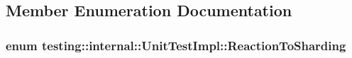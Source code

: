 \subsection{Member Enumeration Documentation}
\hypertarget{classtesting_1_1internal_1_1_unit_test_impl_acc5ffd3f9bc2e87bb3dba4218f58af43}{
\subsubsection[{Reaction\-To\-Sharding}]{\setlength{\rightskip}{0pt plus 5cm}enum {\bf testing\-::internal\-::\-Unit\-Test\-Impl\-::\-Reaction\-To\-Sharding}}}\label{classtesting_1_1internal_1_1_unit_test_impl_acc5ffd3f9bc2e87bb3dba4218f58af43}

